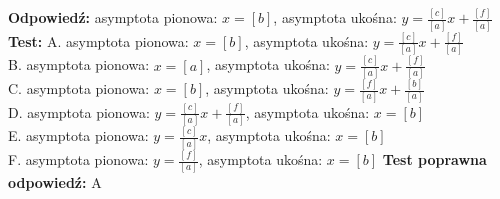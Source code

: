 \documentclass[12pt, a4paper]{article}
\theoremstyle{definition} %
\newcommand{\rozwStop}{\newline}                                            %
\newcommand{\odpStart}{\noindent \textbf{Odpowiedź:}\newline}    %
\newcommand{\odpStop}{\newline}                                             %
\newcommand{\testStart}{\noindent \textbf{Test:}\newline} %
\newcommand{\testStop}{\newline} %
\newcommand{\kluczStart}{\noindent \textbf{Test poprawna odpowiedź:}\newline} %
\newcommand{\kluczStop}{\newline} %
\begin{document}
\rozwStop
\odpStart
asymptota pionowa: $x=[b]$, asymptota ukośna: $y=\frac{[c]}{[a]}x+\frac{[f]}{[a]}$
\odpStop
\testStart
A. asymptota pionowa: $x=[b]$, asymptota ukośna: $y=\frac{[c]}{[a]}x+\frac{[f]}{[a]}$\\
B. asymptota pionowa: $x=[a]$, asymptota ukośna: $y=\frac{[c]}{[a]}x+\frac{[f]}{[a]}$\\
C. asymptota pionowa: $x=[b]$, asymptota ukośna: $y=\frac{[f]}{[a]}x+\frac{[b]}{[a]}$\\
D. asymptota pionowa: $y=\frac{[c]}{[a]}x+\frac{[f]}{[a]}$, asymptota ukośna: $x=[b]$\\
E. asymptota pionowa: $y=\frac{[c]}{[a]}x$, asymptota ukośna: $x=[b]$\\
F. asymptota pionowa: $y=\frac{[f]}{[a]}$, asymptota ukośna: $x=[b]$
\testStop
\kluczStart
A
\kluczStop
\end{document}

